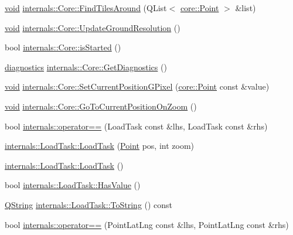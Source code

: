 \begin{DoxyCompactItemize}
\item 
\hyperlink{group___u_a_v_objects_plugin_ga444cf2ff3f0ecbe028adce838d373f5c}{void} \hyperlink{group___o_p_map_widget_ga862fd51a3d103dc955ca08f20abe57b0}{internals\-::\-Core\-::\-Find\-Tiles\-Around} (\-Q\-List$<$ \hyperlink{structcore_1_1_point}{core\-::\-Point} $>$ \&list)
\item 
\hyperlink{group___u_a_v_objects_plugin_ga444cf2ff3f0ecbe028adce838d373f5c}{void} \hyperlink{group___o_p_map_widget_gaafdb82148ca58b162ba477a8e1d520c1}{internals\-::\-Core\-::\-Update\-Ground\-Resolution} ()
\item 
bool \hyperlink{group___o_p_map_widget_ga19e259470609023b204a70c4345ff54c}{internals\-::\-Core\-::is\-Started} ()
\item 
\hyperlink{structdiagnostics}{diagnostics} \hyperlink{group___o_p_map_widget_ga32889efb3fd780403d2005980b0a7dfc}{internals\-::\-Core\-::\-Get\-Diagnostics} ()
\item 
\hyperlink{group___u_a_v_objects_plugin_ga444cf2ff3f0ecbe028adce838d373f5c}{void} \hyperlink{group___o_p_map_widget_ga8d0da9c286137deb71b187c5b003d968}{internals\-::\-Core\-::\-Set\-Current\-Position\-G\-Pixel} (\hyperlink{structcore_1_1_point}{core\-::\-Point} const \&value)
\item 
\hyperlink{group___u_a_v_objects_plugin_ga444cf2ff3f0ecbe028adce838d373f5c}{void} \hyperlink{group___o_p_map_widget_ga65f1168da5561bfccb2ac0053f031027}{internals\-::\-Core\-::\-Go\-To\-Current\-Position\-On\-Zoom} ()
\item 
bool \hyperlink{group___o_p_map_widget_gad390d22cc7b9cc4af3c37661d580f900}{internals\-::operator==} (\-Load\-Task const \&lhs, \-Load\-Task const \&rhs)
\item 
\hyperlink{group___o_p_map_widget_gaef6bad3b01c5866351b69c90979f260e}{internals\-::\-Load\-Task\-::\-Load\-Task} (\hyperlink{structcore_1_1_point}{\-Point} pos, int zoom)
\item 
\hyperlink{group___o_p_map_widget_gab83d811cb8cb0cb08d8c56cad76df071}{internals\-::\-Load\-Task\-::\-Load\-Task} ()
\item 
bool \hyperlink{group___o_p_map_widget_ga158bba758e9847d68a36eb0efee84342}{internals\-::\-Load\-Task\-::\-Has\-Value} ()
\item 
\hyperlink{group___u_a_v_objects_plugin_gab9d252f49c333c94a72f97ce3105a32d}{\-Q\-String} \hyperlink{group___o_p_map_widget_gadf111b2f1982ddca99c4a295856c3968}{internals\-::\-Load\-Task\-::\-To\-String} () const 
\item 
bool \hyperlink{group___o_p_map_widget_ga07dad6b9c91069f83e0e5a90ec53af87}{internals\-::operator==} (\-Point\-Lat\-Lng const \&lhs, \-Point\-Lat\-Lng const \&rhs)

\end{DoxyCompactItemize}
